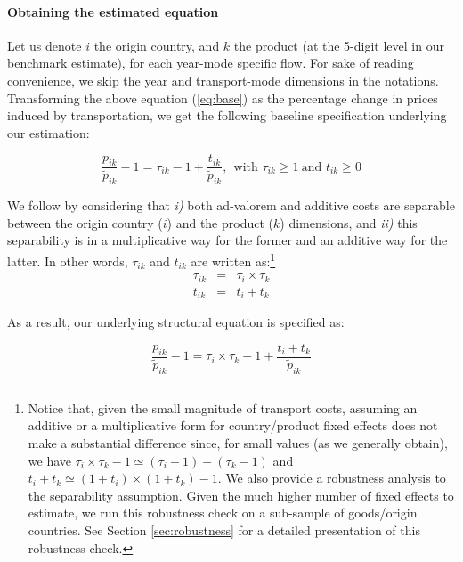 \documentclass[a4paper,11pt]{article}
\begin{document}
\paragraph{Obtaining the estimated equation} Let us denote $i$ the origin country, and $k$ the product (at the 5-digit level in our benchmark estimate), for each year-mode specific flow. For sake of reading convenience, we skip the year and transport-mode dimensions in the notations. Transforming the above equation (\ref{eq:base}) as the percentage change in prices induced by transportation, we get the following baseline specification underlying our estimation:

\begin{equation}
\frac{p_{ik}}{\widetilde{p}_{ik}} -1 = \tau_{ik}-1 +\frac{t_{ik}}{ \widetilde{p}_{ik}}, ~~\text{with } \tau_{ik}\geq 1 ~\text{and }t_{ik}\geq 0 \label{eq:base_estimee}
\end{equation}

We follow \cite{Irrazabal_2015} by considering that \textit{i)} both ad-valorem and additive costs are separable between the origin country ($i$) and the product ($k$) dimensions, and \textit{ii)} this separability is in a multiplicative way for the former and an additive way for the latter.
In other words, $\tau_{ik}$ and $t_{ik}$ are written as:\footnote{Notice that, given the small magnitude of transport costs, assuming an additive or a multiplicative form for country/product fixed effects does not make a substantial difference since, for small values (as we generally obtain), we have $\tau_i\times \tau_k -1\simeq (\tau_i-1) + (\tau_k -1) $ and $t_i+t_k\simeq (1+t_i)\times(1+t_k)-1$.
We also provide a robustness analysis to the separability assumption. Given the much higher number of fixed effects to estimate, we run this robustness check on a sub-sample of goods/origin countries. See Section \ref{sec:robustness} for a detailed presentation of this robustness check.}
\begin{eqnarray}
\tau_{ik} &=& \tau_{i} \times\tau_{k} \label{eq:ad-valorem}\\
t_{ik} &=& t_{i} + t_{k} \label{eq:add}
\end{eqnarray}

\noindent As a result, our underlying structural equation is specified as:

\begin{equation*}
\frac{p_{ik}}{\widetilde{p}_{ik}}-1 =\tau_{i}\times\tau_{k} -1 +\frac{t_{i} + t_{k}}{ \widetilde{p}_{ik}} \label{eq:theory_equation}
\end{equation*}
\end{document}
